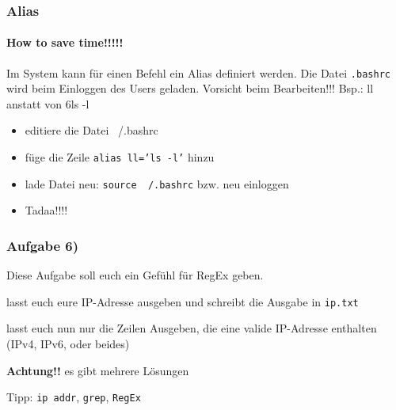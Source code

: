 \documentclass[12pt,utf8]{beamer}
\begin{document}
\begin{frame}
\frametitle{Alias}
\framesubtitle{How to save time!!!!!}
Im System kann für einen Befehl ein Alias definiert werden.
Die Datei \texttt{.bashrc} wird beim Einloggen des Users geladen.
Vorsicht beim Bearbeiten!!!
Bsp.: ll anstatt von 6ls -l
\begin{itemize}[<+->]
	\item editiere die Datei ~/.bashrc
	\item füge die Zeile \texttt{alias ll='ls -l'} hinzu
	\item lade Datei neu: \texttt{source ~/.bashrc} bzw. neu einloggen
	\item Tadaa!!!!
\end{itemize}
\end{frame}

\begin{frame}
\frametitle{Aufgabe 6)}
Diese Aufgabe soll euch ein Gefühl für RegEx geben.
\begin{itemize}
{\footnotesize
	\item lasst euch eure IP-Adresse ausgeben und schreibt die Ausgabe in \texttt{ip.txt}
	\item lasst euch nun nur die Zeilen Ausgeben, die eine valide IP-Adresse enthalten (IPv4, IPv6, oder beides)
	\item \textbf{Achtung!!} es gibt mehrere Lösungen
	}
\end{itemize}
{\scriptsize Tipp: \texttt{ip addr}, \texttt{grep}, \texttt{RegEx}}
\end{frame}
\end{document}
